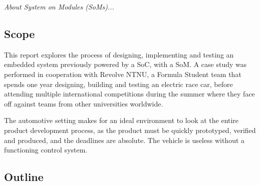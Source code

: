 \emph{About System on Modules (SoMs)...}


\subsection{Scope}

This report explores the process of designing, implementing and testing an embedded system previously powered by a SoC, with a SoM. A case study was performed in cooperation with Revolve NTNU, a Formula Student team that spends one year designing, building and testing an electric race car, before attending multiple international competitions during the summer where they face off against teams from other universities worldwide.

The automotive setting makes for an ideal environment to look at the entire product development process, as the product must be quickly prototyped, verified and produced, and the deadlines are absolute. The vehicle is useless without a functioning control system.


\subsection{Outline}
